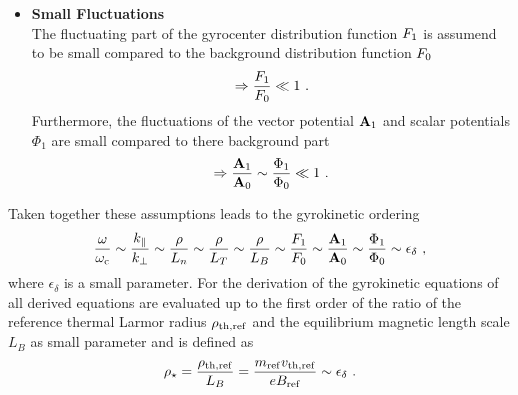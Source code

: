 \begin{itemize}
	\item \textbf{Small Fluctuations}\\
		The fluctuating part of the gyrocenter distribution function $F_1$ is assumend to be small compared to the background distribution function $F_0$ 
		\begin{gather*}
			\Rightarrow \frac{F_1}{F_0} \ll 1~.
		\end{gather*}
		Furthermore, the fluctuations of the vector potential $\boldsymbol{\mathbf{A}}_1$ and scalar potentials $\Phi_1$ are small compared to there background part
		\begin{gather*}
			\Rightarrow \frac{\boldsymbol{\mathbf{A}}_1}{\boldsymbol{\mathbf{A}}_0} \sim \frac{\Phi_1}{\Phi_0}  \ll 1~.
		\end{gather*}
\end{itemize}
Taken together these assumptions leads to the gyrokinetic ordering
\begin{gather}
	\frac{\omega}{\omega_\mathrm{c}} \sim \frac{k_\parallel}{k_\perp} \sim \frac{\rho}{L_n} \sim \frac{\rho}{L_T} \sim \frac{\rho}{L_B} \sim \frac{F_1}{F_0} \sim \frac{\boldsymbol{\mathbf{A}}_1}{\boldsymbol{\mathbf{A}}_0} \sim \frac{\Phi_1}{\Phi_0} \sim \epsilon_\delta~,
\end{gather}
where $\epsilon_\delta$ is a small parameter. For the derivation of the gyrokinetic equations of {\gkw} all derived equations are evaluated up to the first order of the ratio of the reference thermal Larmor radius $\rho_{\mathrm{th},\mathrm{ref}}$ and the equilibrium magnetic length scale $L_B$ as small parameter and is defined as
\begin{gather}
	\rho_\star = \frac{\rho_{\mathrm{th},\mathrm{ref}}}{L_B} = \frac{m_\mathrm{ref} v_{\mathrm{th},\mathrm{ref}}}{e B_\mathrm{ref}} \sim \epsilon_\delta~.
	\label{eq:rhostar}
\end{gather}